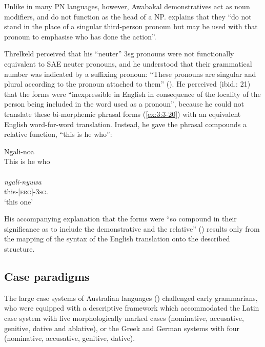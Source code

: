 Unlike in many PN languages, however, Awabakal demonstratives act as noun modifiers, and do not function as the head of a NP. \citet[34]{lissarrague_salvage_2006} explains that they “do not stand in the place of a singular third-person pronoun but may be used with that pronoun to emphasise who has done the action”. 

\hspace*{-2.9pt}Threlkeld perceived that his “neuter” 3sg pronouns were not functionally equivalent to SAE neuter pronouns, and he understood that their grammatical number was indicated by a suffixing pronoun: “These pronouns are singular and plural according to the pronoun attached to them” (\citeyear[22]{threlkeld_australian_1834}). He perceived (ibid.: 21) that the forms were “inexpressible in English in consequence of the locality of the person being included in the word used as a pronoun”, because he could not translate these bi-morphemic phrasal forms (\ref{ex:3:3-20}) with an equivalent English word-for-word translation. Instead, he gave the phrasal compounds a relative function, “this is he who”:

\ea\label{ex:3:3-20}
Ngali-noa \\
\glt This is he who \\
\citep[22]{threlkeld_australian_1834} \\
\gll \textit{ngali-nyuwa} \\
this-[\textsc{erg}]-3\textsc{sg}. \\
\glt `this one' \\
\z

         
His accompanying explanation that the forms were “so compound in their significance as to include the demonstrative and the relative” (\citealt[21]{threlkeld_australian_1834}) results only from the mapping of the syntax of the English translation onto the described structure. 

\subsection{Case paradigms}
\label{sec:key:3.3.3}

The large case systems of Australian languages (\citealt{iggesen_number_2013}) challenged early grammarians, who were equipped with a descriptive framework which accommodated the Latin case system with five morphologically marked cases (nominative, accusative, genitive, dative and ablative), or the Greek and German systems with four (nominative, accusative, genitive, dative).

